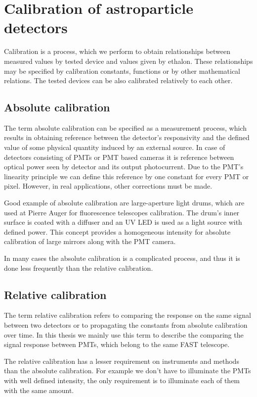 
\chapter{Calibration of astroparticle detectors}
Calibration is a process, which we perform to obtain relationships between measured values by tested device and values given by ethalon. These relationships may be specified by calibration constants, functions or by other mathematical relations. The tested devices can be also calibrated relatively to each other.
\par
\section{Absolute calibration}
The term absolute calibration can be specified as a measurement process, which results in obtaining reference between the detector's responsivity and the defined value of some physical quantity induced by an external source. In case of detectors consisting of PMTs or PMT based cameras it is reference between optical power seen by detector and its output photocurrent. Due to the PMT's linearity principle we can define this reference by one constant for every PMT or pixel. However, in real applications, other corrections must be made.

\par
Good example of absolute calibration are large-aperture light drums, which are used at Pierre Auger for fluorescence telescopes calibration. The drum's inner surface is coated with a diffuser and an UV LED is used as a light source with defined power. This concept provides a homogeneous intensity for absolute calibration of large mirrors along with the PMT camera. 

\par
In many cases the absolute calibration is a complicated process, and thus it is done less frequently than the relative calibration.

\section{Relative calibration}
The term relative calibration refers to comparing the response on the same signal between two detectors or to propagating the constants from absolute calibration over time.
In this thesis we mainly use this term to describe the comparing the signal response between PMTs, which belong to the same FAST telescope. 
\par
The relative calibration has a lesser requirement on instruments and methods than the absolute calibration. For example we don't have to illuminate the PMTs with well defined intensity, the only requirement is to illuminate each of them with the same amount. 


